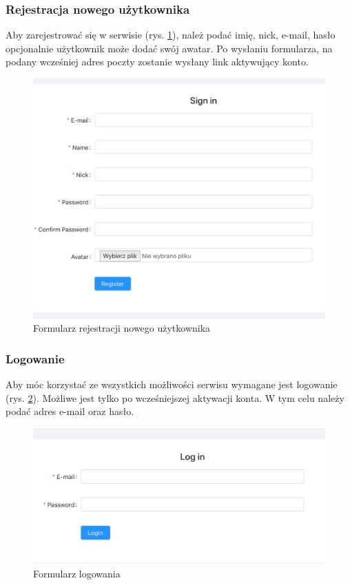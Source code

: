 \documentclass[declaration,shortabstract]{iithesis}
\begin{document}
\subsubsection{Rejestracja nowego użytkownika}
Aby zarejestrować się w serwisie (rys. \ref{fig:register}), należ podać imię, nick, e-mail, hasło opcjonalnie użytkownik może dodać swój awatar. Po wysłaniu formularza, na podany wcześniej adres poczty zostanie wysłany link aktywujący konto.

\begin{figure}
    \centering
    \includegraphics[width=\textwidth]{images/rejestracja.png}
    \caption{Formularz rejestracji nowego użytkownika}
    \label{fig:register}
\end{figure}

\subsubsection{Logowanie}
Aby móc korzystać ze wszystkich możliwości serwisu wymagane jest logowanie (rys. \ref{fig:login}). Możliwe jest tylko po wcześniejszej aktywacji konta. W tym celu należy podać adres e-mail oraz hasło.

\begin{figure}
    \centering
    \includegraphics[width=\linewidth]{images/logowanie.png}
    \caption{Formularz logowania}
    \label{fig:login}
\end{figure}
\end{document}
